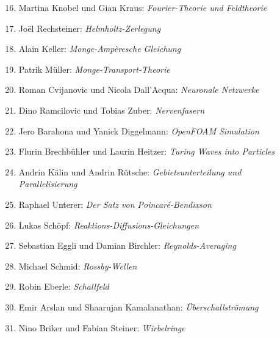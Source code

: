 \documentclass[handout]{beamer}
\begin{document}
\begin{frame}
\begin{columns}[t,onlytextwidth]
\begin{column}{0.60\textwidth}
\begin{description}
\begin{enumerate}
\setcounter{enumi}{15}
\item Martina Knobel und Gian Kraus: {\em Fourier-Theorie und Feldtheorie}
\item Joël Rechsteiner: {\em Helmholtz-Zerlegung}
\item Alain Keller: {\em Monge-Ampèresche Gleichung}
\item Patrik Müller: {\em Monge-Transport-Theorie}
\item Roman Cvijanovic und Nicola Dall'Acqua: {\em 
Neuronale Netzwerke}
\item Dino Ramcilovic und Tobias Zuber: {\em Nervenfasern}
\item Jero Barahona und Yanick Diggelmann: {\em OpenFOAM Simulation}
\item Flurin Brechbühler und Laurin Heitzer: {\em Turing Waves into Particles}
\item Andrin Kälin und Andrin Rütsche: {\em Gebietsunterteilung und
Parallelisierung}
\item Raphael Unterer: {\em Der Satz von Poincaré-Bendixson}
\item Lukas Schöpf: {\em Reaktions-Diffusions-Gleichungen}
\item Sebastian Eggli und Damian Birchler: {\em Reynolds-Averaging}
\item Michael Schmid: {\em Rossby-Wellen}
\item Robin Eberle: {\em Schallfeld}
\item Emir Arslan und Shaarujan Kamalanathan: {\em Überschallströmung}
\item Nino Briker und Fabian Steiner: {\em Wirbelringe}
\end{enumerate}
\end{description}
\end{column}
\begin{column}{0.01\textwidth}
\end{column}
\end{columns}
\end{frame}
\end{document}
